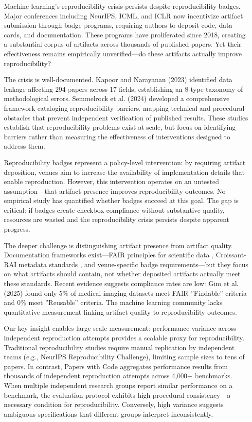 
Machine learning's reproducibility crisis persists despite reproducibility badges. Major conferences including NeurIPS, ICML, and ICLR now incentivize artifact submission through badge programs, requiring authors to deposit code, data cards, and documentation. These programs have proliferated since 2018, creating a substantial corpus of artifacts across thousands of published papers. Yet their effectiveness remains empirically unverified---do these artifacts actually improve reproducibility?

The crisis is well-documented. Kapoor and Narayanan (2023) identified data leakage affecting 294 papers across 17 fields, establishing an 8-type taxonomy of methodological errors. Semmelrock et al. (2024) developed a comprehensive framework cataloging reproducibility barriers, mapping technical and procedural obstacles that prevent independent verification of published results. These studies establish that reproducibility problems exist at scale, but focus on identifying barriers rather than measuring the effectiveness of interventions designed to address them.

Reproducibility badges represent a policy-level intervention: by requiring artifact deposition, venues aim to increase the availability of implementation details that enable reproduction. However, this intervention operates on an untested assumption---that artifact presence improves reproducibility outcomes. No empirical study has quantified whether badges succeed at this goal. The gap is critical: if badges create checkbox compliance without substantive quality, resources are wasted and the reproducibility crisis persists despite apparent progress.

The deeper challenge is distinguishing artifact presence from artifact quality. Documentation frameworks exist---FAIR principles for scientific data \citep{Wilkinson2016}, Croissant-RAI metadata standards \citep{Jain2024}, and venue-specific badge requirements---but they focus on what artifacts should contain, not whether deposited artifacts actually meet these standards. Recent evidence suggests compliance rates are low: Gim et al. (2025) found only 5\% of medical imaging datasets meet FAIR ''Findable'' criteria and 0\% meet ''Reusable'' criteria. The machine learning community lacks quantitative measurement linking artifact quality to reproducibility outcomes.

Our key insight enables large-scale measurement: performance variance across independent reproduction attempts provides a scalable proxy for reproducibility. Traditional reproducibility studies require manual replication by independent teams (e.g., NeurIPS Reproducibility Challenge), limiting sample sizes to tens of papers. In contrast, Papers with Code aggregates performance results from thousands of independent reproduction attempts across 4,000+ benchmarks. When multiple independent research groups report similar performance on a benchmark, the evaluation protocol exhibits high procedural consistency---a necessary condition for reproducibility. Conversely, high variance suggests ambiguous specifications that different groups interpret inconsistently.

